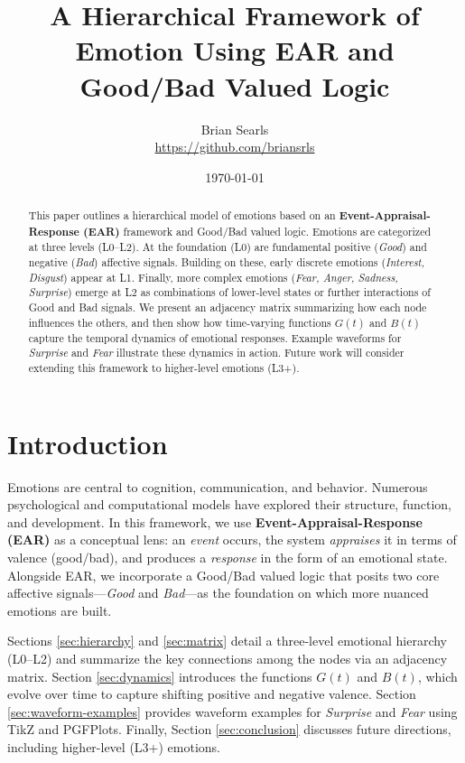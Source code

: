 \documentclass[11pt]{article}
\title{A Hierarchical Framework of Emotion Using EAR and Good/Bad Valued Logic}
\author{Brian Searls\\\href{https://github.com/briansrls}{https://github.com/briansrls}}
\date{\today}
\begin{document}
\maketitle

\begin{abstract}
This paper outlines a hierarchical model of emotions based on an \textbf{Event-Appraisal-Response (EAR)} framework and Good/Bad valued logic. Emotions are categorized at three levels (L0--L2). At the foundation (L0) are fundamental positive (\textit{Good}) and negative (\textit{Bad}) affective signals. Building on these, early discrete emotions (\textit{Interest, Disgust}) appear at L1. Finally, more complex emotions (\textit{Fear, Anger, Sadness, Surprise}) emerge at L2 as combinations of lower-level states or further interactions of Good and Bad signals. We present an adjacency matrix summarizing how each node influences the others, and then show how time-varying functions \(G(t)\) and \(B(t)\) capture the temporal dynamics of emotional responses. Example waveforms for \textit{Surprise} and \textit{Fear} illustrate these dynamics in action. Future work will consider extending this framework to higher-level emotions (L3+).
\end{abstract}

\tableofcontents

\section{Introduction}
Emotions are central to cognition, communication, and behavior. Numerous psychological and computational models have explored their structure, function, and development. In this framework, we use \textbf{Event-Appraisal-Response (EAR)} as a conceptual lens: an \textit{event} occurs, the system \textit{appraises} it in terms of valence (good/bad), and produces a \textit{response} in the form of an emotional state. Alongside EAR, we incorporate a Good/Bad valued logic that posits two core affective signals—\textit{Good} and \textit{Bad}—as the foundation on which more nuanced emotions are built.

Sections \ref{sec:hierarchy} and \ref{sec:matrix} detail a three-level emotional hierarchy (L0--L2) and summarize the key connections among the nodes via an adjacency matrix. Section \ref{sec:dynamics} introduces the functions \(G(t)\) and \(B(t)\), which evolve over time to capture shifting positive and negative valence. Section \ref{sec:waveform-examples} provides waveform examples for \textit{Surprise} and \textit{Fear} using TikZ and PGFPlots. Finally, Section \ref{sec:conclusion} discusses future directions, including higher-level (L3+) emotions.
\end{document}

